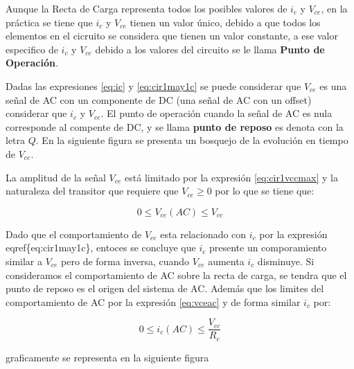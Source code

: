 \documentclass{article}
\begin{document}
Aunque la Recta de Carga representa todos los posibles valores de
$i_{c}$ y $V_{ce}$, en la práctica se tiene que $i_{c}$ y $V_{ce}$
tienen un valor único, debido a que todos los elementos en el cicruito
se considera que tienen un valor constante, a ese valor especifico de
$i_{c}$ y $V_{ce}$ debido a los valores del circuito se le llama
\textbf{Punto de Operación}.

Dadas las expresiones \eqref{eq:ic} y \eqref{eq:cir1may1c} se puede
considerar que $V_{ce}$ es una señal de AC con un componente de DC (una
señal de AC con un offset) considerar que $i_{c}$ y $V_{ce}$. El punto
de operación cuando la señal de AC es nula corresponde al compente de
DC, y se llama \textbf{punto de reposo} es denota con la letra $Q$. En
la siguiente figura se presenta un bosquejo de la evolución en tiempo de
$V_{ce}$.

La amplitud de la señal $V_{ce}$ está limitado por la expresión
\eqref{eq:cir1vccmax} y la naturaleza del transitor que requiere que
$V_{ce}\geq0$ por lo que se tiene que:

\begin{equation}\label{eq:vceac}
0\leq V_{ce}(AC) \leq V_{cc}
\end{equation}

Dado que el comportamiento de $V_{ce}$ esta relacionado con $i_{c}$ por
la expresión eqref\{eq:cir1may1c\}, entoces se concluye que $i_{c}$
presente un comporamiento similar a $V_{ce}$ pero de forma inversa,
cuando $V_{ce}$ aumenta $i_{c}$ disminuye. Si consideramos el
comportamiento de AC sobre la recta de carga, se tendra que el punto de
reposo es el origen del sistema de AC. Además que los limites del
comportamiento de AC por la expresión \eqref{eq:vceac} y de forma
similar $i_{c}$ por:

\begin{equation}\label{eq:icac}
0\leq i_{c}(AC) \leq \frac{V_{cc}}{R_{c}}
\end{equation}

graficamente se representa en la siguiente figura



    
    
    
    
\end{document}
